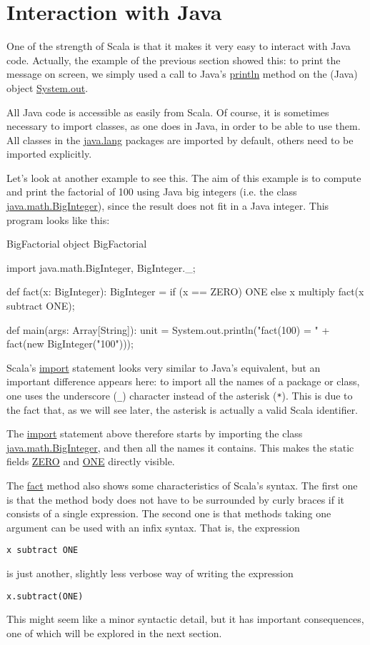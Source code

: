 \documentclass[a4paper,12pt]{article}
\newcommand{\langname}[1]{#1\xspace}
\newcommand{\Scala}{\langname{Scala}}
\newcommand{\Java}{\langname{Java}}
\newcommand{\ident}[1]{\url{#1}\xspace}
\begin{document}
\section{Interaction with Java}
\label{sec:inter-with-java}

One of the strength of \Scala is that it makes it very easy to
interact with \Java code. Actually, the example of the previous
section showed this: to print the message on screen, we simply used a
call to \Java's \ident{println} method on the (\Java) object
\ident{System.out}.

All \Java code is accessible as easily from \Scala. Of course, it is
sometimes necessary to import classes, as one does in \Java, in order
to be able to use them. All classes in the \ident{java.lang} packages
are imported by default, others need to be imported explicitly.

Let's look at another example to see this. The aim of this example is
to compute and print the factorial of 100 using \Java big integers
(i.e. the class \ident{java.math.BigInteger}), since the result does
not fit in a \Java integer. This program looks like this:
\begin{scalaprogram}{BigFactorial}
object BigFactorial {
  import java.math.BigInteger, BigInteger._;

  def fact(x: BigInteger): BigInteger =
    if (x == ZERO) ONE
    else x multiply fact(x subtract ONE);

  def main(args: Array[String]): unit =
    System.out.println("fact(100) = "
                       + fact(new BigInteger("100")));
}
\end{scalaprogram}

\Scala's \ident{import} statement looks very similar to \Java's
equivalent, but an important difference appears here: to import all
the names of a package or class, one uses the underscore (\verb|_|)
character instead of the asterisk (\verb|*|). This is due to the fact
that, as we will see later, the asterisk is actually a valid \Scala
identifier.

The \ident{import} statement above therefore starts by importing the
class \ident{java.math.BigInteger}, and then all the names it
contains. This makes the static fields \ident{ZERO} and \ident{ONE}
directly visible.

The \ident{fact} method also shows some characteristics of \Scala's
syntax. The first one is that the method body does not have to be
surrounded by curly braces if it consists of a single expression.
The second one is that methods taking one argument can be used with an
infix syntax. That is, the expression
\begin{verbatim}
x subtract ONE
\end{verbatim}
is just another, slightly less verbose way of writing the expression
\begin{verbatim}
x.subtract(ONE)
\end{verbatim}
This might seem like a minor syntactic detail, but it has important
consequences, one of which will be explored in the next section.
\end{document}
